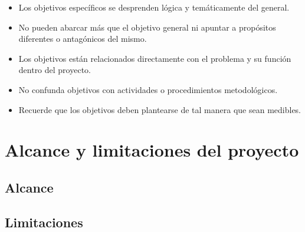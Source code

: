 \begin{itemize}
    \item Los objetivos específicos se desprenden lógica y temáticamente del general.
    \item No pueden abarcar más que el objetivo general ni apuntar a propósitos
    diferentes o antagónicos del mismo.
    \item Los objetivos están relacionados directamente con el problema y su función
    dentro del proyecto.
    \item No confunda objetivos con actividades o procedimientos metodológicos.
    \item Recuerde que los objetivos deben plantearse de tal manera que sean medibles.
\end{itemize}

\section{Alcance y limitaciones del proyecto}
\lipsum[1]

\subsection{Alcance}  
\lipsum[1]

\subsection{Limitaciones}  
\lipsum[1]